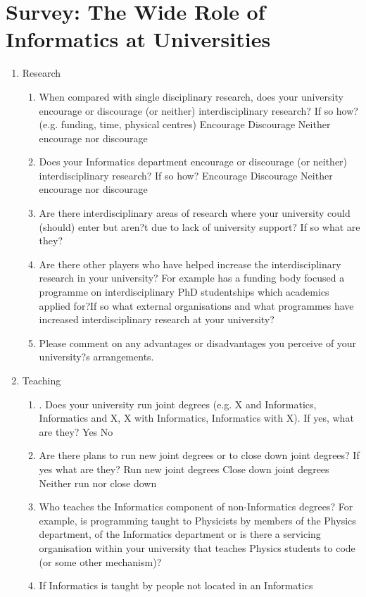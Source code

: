 \newpage
\appendix
\section{Survey: The Wide Role of Informatics at Universities}\label{appendix}
\begin{enumerate}
\item Research
\begin{enumerate}
\item When compared with single disciplinary research, does your
university encourage or discourage (or neither) interdisciplinary
research? If so how? (e.g. funding, time, physical centres)
Encourage
Discourage
Neither encourage nor discourage
\item Does your Informatics department encourage or discourage (or
neither) interdisciplinary research? If so how?
Encourage
Discourage
Neither encourage nor discourage
\item Are there interdisciplinary areas of research where your university
could (should) enter but aren?t due to lack of university support? If so
what are they?
\item Are there other players who have helped increase the
interdisciplinary research in your university?
For example has a funding body focused a programme on
interdisciplinary PhD studentships which academics applied for?If so
what external organisations and what programmes have increased
interdisciplinary research at your university?
\item Please comment on any advantages or disadvantages you perceive
of your university?s arrangements.
\end{enumerate}
\item Teaching
\begin{enumerate}
\item. Does your university run joint degrees (e.g. X and Informatics, Informatics and X, X with Informatics, Informatics with X). If yes,
what are they?
Yes
No
\item Are there plans to run new joint degrees or to close down joint
degrees? If yes what are they?
Run new joint degrees
Close down joint degrees
Neither run nor close down
\item Who teaches the Informatics component of non-Informatics degrees? For example, is programming taught to Physicists by members
of the Physics department, of the Informatics department or is there a
servicing organisation within your university that teaches Physics
students to code (or some other mechanism)?
\item If Informatics is taught by people not located in an Informatics

\end{enumerate}
\end{enumerate}
